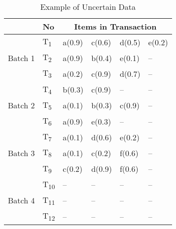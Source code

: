 %
%
\begin{table}[t]
\centering

\begin{tabular}{|l|l|l|l|l|l|}
\hline
& No & \multicolumn{4}{c|}{Items in Transaction} \\ \hline \hline
\multirow{3}{*}{Batch 1}	&	T\textsubscript{1} & a(0.9) & c(0.6) & d(0.5) & e(0.2)\\
							&	T\textsubscript{2} & a(0.9) & b(0.4) & e(0.1) & --    \\
							&	T\textsubscript{3} & a(0.2) & c(0.9) & d(0.7) & --    \\\hline
\multirow{3}{*}{Batch 2}	&	T\textsubscript{4} & b(0.3) & c(0.9) & -- & --\\
							&	T\textsubscript{5} & a(0.1) & b(0.3) & c(0.9) & --    \\
							&	T\textsubscript{6} & a(0.9) & e(0.3) & -- & --        \\\hline
\multirow{3}{*}{Batch 3}	&	T\textsubscript{7} & a(0.1) & d(0.6) & e(0.2) & --    \\
							&	T\textsubscript{8} & a(0.1) & c(0.2) & f(0.6) & --    \\
							&	T\textsubscript{9} & c(0.2) & d(0.9) & f(0.6) & --    \\\hline
							
\multirow{3}{*}{Batch 4}	&	T\textsubscript{10} &  --  &  --  &  --  & --    \\
							&	T\textsubscript{11} &  --  &  --  &  --  & --    \\
							&	T\textsubscript{12} &  --  &  --  &  --  & --    \\\hline
\end{tabular}
\caption{Example of Uncertain Data}
\label{table:transaction_batch}
\end{table}


%
%